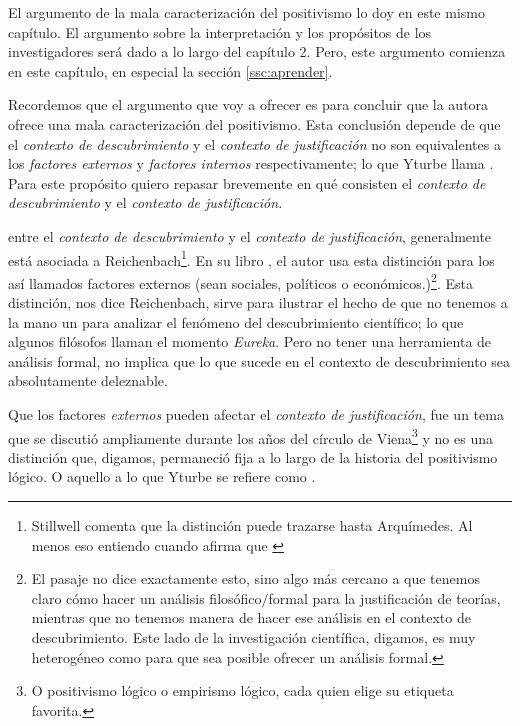 El argumento de la mala caracterización del positivismo lo doy en este mismo capítulo.
El argumento sobre la interpretación y los propósitos de los investigadores será dado a lo largo del capítulo 2.
Pero, este argumento comienza en este capítulo, en especial la sección \ref{ssc:aprender}.

Recordemos que el argumento que voy a ofrecer es para concluir que la autora ofrece una mala caracterización del positivismo.
Esta conclusión depende de que el \emph{contexto de descubrimiento} y el \emph{contexto de justificación} no son equivalentes a los \emph{factores externos} y \emph{factores internos} respectivamente; lo que Yturbe llama .
Para este propósito quiero repasar brevemente en qué consisten el \emph{contexto de descubrimiento} y el \emph{contexto de justificación.}



 entre el \emph{contexto de descubrimiento} y el \emph{contexto de justificación}, generalmente está asociada a Reichenbach\footnote{
	Stillwell comenta que la distinción puede trazarse hasta Arquímedes.
	Al menos eso entiendo cuando afirma que  \parencite[p. 56]{stillwell1989mathematics}
	}.
En su libro , el autor usa esta distinción para  los así llamados factores externos (sean sociales, políticos o económicos.)\footnote{
	El pasaje no dice exactamente esto, sino algo más cercano a que tenemos claro cómo hacer un análisis filosófico$/$formal para la justificación de teorías, mientras que no tenemos manera de hacer ese análisis en el contexto de descubrimiento.
	Este lado de la investigación científica, digamos, es muy heterogéneo como para que sea posible ofrecer un análisis formal.
	}.
Esta distinción, nos dice Reichenbach, sirve para ilustrar el hecho de que no tenemos a la mano un  para analizar el fenómeno del descubrimiento científico; lo que algunos filósofos \parencite{reichenbach1938experience, Seo2015} llaman el momento \emph{Eureka}.
Pero no tener una herramienta de análisis formal, no implica que lo que sucede en el contexto de descubrimiento sea absolutamente deleznable.

Que los factores \emph{externos} pueden afectar el \emph{contexto de justificación}, fue un tema que se discutió ampliamente durante los años del círculo de Viena\footnote{
	O positivismo lógico o empirismo lógico, cada quien elige su etiqueta favorita.
} y no es una distinción que, digamos,  permaneció fija a lo largo de la historia del positivismo lógico. 
O aquello a lo que Yturbe se refiere como .

